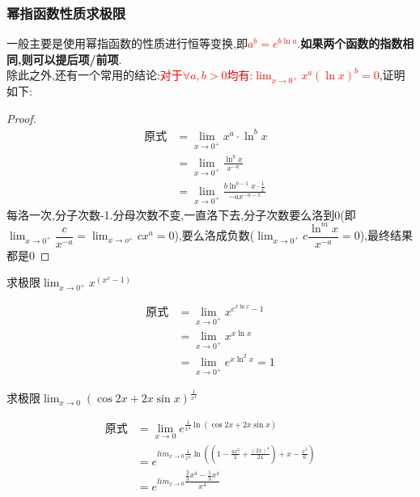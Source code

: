 \documentclass[8pt a4paper, oneside, UTF8]{ctexbook}
\begin{document}
\begin{sloppypar}
    \subsubsection{幂指函数性质求极限}
    一般主要是使用幂指函数的性质进行恒等变换,即\textcolor{red}{$a^b=e^{b\ln a}$}.\textbf{如果两个函数的指数相同,则可以提后项/前项}.\\
    除此之外,还有一个常用的结论:\textcolor{red}{对于$\forall a,b>0$均有:$\lim_{x\to 0^+}x^a(\ln x)^b=0$},证明如下:
    \begin{proof}
        \begin{align*}
            \text{原式} & = \lim_{x\to0^{+}}x^{a}\cdot\ln^{b}x                            & \\
                      & = \lim_{x\to0^{+}}\frac{\ln^{b}x}{x^{-a}}                       & \\
                      & =\lim_{x\to0^{+}}\frac{b\ln^{b-1}x\cdot\frac{1}{x}}{-ax^{-a-1}}
        \end{align*}
        每洛一次,分子次数-1.分母次数不变,一直洛下去,分子次数要么洛到0(即$\lim_{x\to 0^+}\dfrac{c}{x^{-a}}=\lim_{x\to o^+} cx^a=0$),要么洛成负数($\lim_{x\to 0^+ }c\dfrac{\ln^m x}{x^{-a}}=0$),最终结果都是0
    \end{proof}
    \begin{problem}
    求极限$\lim_{x\to0^+}x^{(x^x-1)}$
    \end{problem}
    \begin{solution}
        \begin{align*}
            \text{原式} & =\lim_{x\to0^+}x^{e^{x \ln x}-1} \\
                      & =\lim_{x\to0^+} x^{x \ln x}      \\
                      & =\lim_{x\to0^+} e^{x \ln^2 x}=1
        \end{align*}
    \end{solution}
    \begin{problem}
    求极限$\operatorname*{lim}_{x\to0}(\cos2x+2x \sin x)^{\frac{1}{x^{4}}}$
    \end{problem}
    \begin{solution}
        \begin{align*}
            \text{原式} & =\lim_{x\to0}e^{\frac{1}{x^4}\ln(\cos 2x+2x\sin x)}                                        \\
                      & = e^{lim_{x\to0}{\frac{1}{x^4} \ln((1-\frac{4x^2}{2}+\frac{(2x)^4}{24})+x-\frac{x^3}{6})}} \\
                      & = e^{lim_{x\to0}{\dfrac{\frac{2}{3}x^4-\frac{1}{3}x^4}{x^4}}}                              \\

\end{align*}
\end{solution}
\end{sloppypar}
\end{document}
